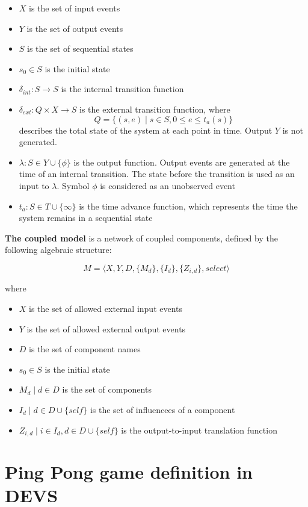 \documentclass[fleqn,10pt]{olplainarticle}
\begin{document}
\begin{itemize}
\item $X$ is the set of input events
\item $Y$ is the set of output events
\item $S$ is the set of sequential states
\item $s_0 \in S$ is the initial state
\item $\delta_{int} : S \to S$ is the internal transition function
\item $\delta_{ext} : Q \times X \to S$ is the external transition function, where
$$Q = \{(s,e) \mid s \in S, 0 \leq e \leq t_a(s) \}$$
describes the total state of the system at each point in time. Output $Y$ is not generated.
\item $\lambda : S \in Y \cup \{\phi\}$ is the output function. Output events are generated at the time of an internal transition. The state before the transition is used as an input to $\lambda$.
Symbol $\phi$ is considered as an unobserved event
\item $t_a : S \in T \cup \{\infty\}$ is the time advance function, which represents the time the system remains in a sequential state
\end{itemize}

\pagebreak

\noindent \textbf{The coupled model} is a network of coupled components, defined by the following algebraic structure:

$$M = \langle X, Y, D, \{M_d\}, \{I_d\}, \{Z_{i,d}\}, select \rangle$$

\noindent where

\begin{itemize}
    \item $X$ is the set of allowed external input events
    \item $Y$ is the set of allowed external output events
    \item $D$ is the set of component names
    \item $s_0 \in S$ is the initial state
    \item $M_d \mid d \in D$ is the set of components
    \item $I_d \mid d \in D \cup \{self\}$ is the set of influencees of a component
    \item $Z_{i,d} \mid i \in I_d, d \in D \cup \{self\}$ is the output-to-input translation function
\end{itemize}

\section{Ping Pong game definition in DEVS}
\end{document}
